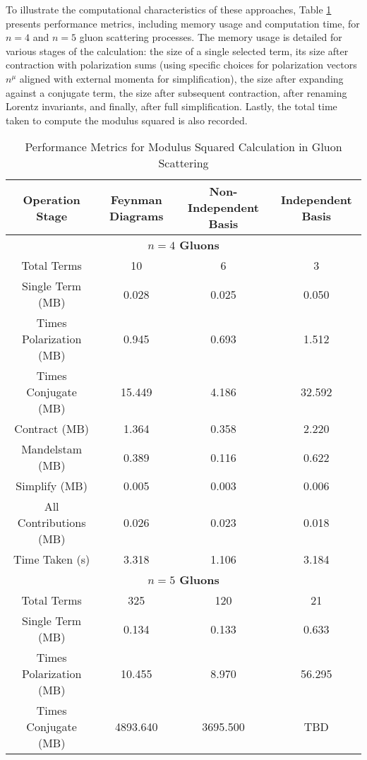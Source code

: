\documentclass[main.tex]{subfiles}
\begin{document}
To illustrate the computational characteristics of these approaches, Table \ref{tab:modulus-squared-performance} presents performance metrics,
including memory usage and computation time, for $n=4$ and $n=5$ gluon scattering processes.
The memory usage is detailed for various stages of the calculation: the size of a single selected term, its size after contraction with polarization sums (using specific choices for polarization vectors $n^{\mu}$ aligned with external momenta for simplification),
the size after expanding against a conjugate term, the size after subsequent contraction, after renaming Lorentz invariants, and finally, after full simplification. Lastly,
the total time taken to compute the modulus squared is also recorded.

\begin{table}[htbp]
    \centering
    \caption{Performance Metrics for Modulus Squared Calculation in Gluon Scattering}
    \label{tab:modulus-squared-performance}
    \begin{tabular}{|c|c|c|c|}
        \hline
        \textbf{Operation Stage} & \textbf{Feynman Diagrams} & \textbf{Non-Independent Basis} & \textbf{Independent Basis} \\
        \hline
        \multicolumn{4}{|c|}{\textbf{$n=4$ Gluons}} \\
        \hline
        Total Terms & 10 & 6 & 3 \\
        Single Term (MB) & 0.028 & 0.025 & 0.050 \\
        Times Polarization (MB) & 0.945 & 0.693 & 1.512 \\
        Times Conjugate (MB) & 15.449 & 4.186 & 32.592 \\
        Contract (MB) & 1.364 & 0.358 & 2.220 \\
        Mandelstam (MB) & 0.389 & 0.116 & 0.622\\
        Simplify (MB) & 0.005 & 0.003 & 0.006\\
        All Contributions (MB) & 0.026 & 0.023 & 0.018 \\
        Time Taken (s) & 3.318 & 1.106 & 3.184 \\
        \hline
        \multicolumn{4}{|c|}{\textbf{$n=5$ Gluons}} \\
        \hline
        Total Terms & 325 & 120 & 21 \\
        Single Term (MB) & 0.134 & 0.133 & 0.633 \\
        Times Polarization (MB) & 10.455 & 8.970 & 56.295 \\
        Times Conjugate (MB) & 4893.640 & 3695.500 & TBD \\

\end{tabular}
\end{table}
\end{document}
